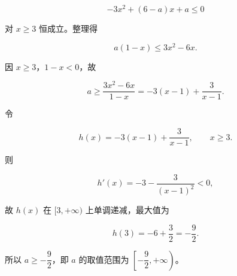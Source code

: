 \begin{answer}
\nopagebreak[4]
\[
-3x^{2}+(6-a)x+a\le 0
\]

对 $x\ge 3$ 恒成立。整理得

\nopagebreak[4]
\[
a(1-x)\le 3x^{2}-6x.
\]

因 $x\ge 3$，$1-x<0$，故

\nopagebreak[4]
\[
a\ge\frac{3x^{2}-6x}{1-x}
=-3(x-1)+\frac{3}{x-1}.
\]

令

\nopagebreak[4]
\[
h(x)=-3(x-1)+\frac{3}{x-1},\qquad x\ge 3.
\]

则

\nopagebreak[4]
\[
h'(x)=-3-\frac{3}{(x-1)^{2}}<0,
\]

故 $h(x)$ 在 $[3,+\infty)$ 上单调递减，最大值为

\nopagebreak[4]
\[
h(3)=-6+\frac{3}{2}=-\frac{9}{2}.
\]

所以 $a\ge-\dfrac{9}{2}$，即 $a$ 的取值范围为 $\left[-\dfrac{9}{2},+\infty\right)$。


\gkanswer{答案（2）：$a\ge-\dfrac{9}{2}$，即 $a\in\left[-\dfrac{9}{2},+\infty\right)$。}

\end{answer}
